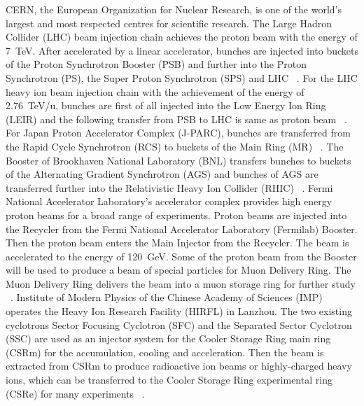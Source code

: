 \gls{CERN}, the European Organization for Nuclear Research, is one of the world's largest and most respected centres for scientific research. The Large Hadron Collider (\gls{LHC}) beam injection chain achieves the proton beam with the energy of \SI{7}{TeV}. After accelerated by a linear accelerator, bunches are injected into buckets of the Proton Synchrotron Booster (\gls{PSB}) and further into the Proton Synchrotron (\gls{PS}), the Super Proton Synchrotron (\gls{SPS}) and LHC ~\cite{ferrand_synchronization_2015}. For the LHC heavy ion beam injection chain with the achievement of the energy of \SI{2.76}{TeV/u}, bunches are first of all injected into the Low Energy Ion Ring (\gls{LEIR}) and the following transfer from PSB to LHC is same as proton beam ~\cite{ferrand_synchronization_2015}. For Japan Proton Accelerator Complex (\gls{J-PARC}), bunches are transferred from the Rapid Cycle Synchrotron (\gls{RCS}) to buckets of the Main Ring (\gls{MR}) ~\cite{_j-parc_????}. The Booster of Brookhaven National Laboratory (\gls{BNL}) transfers bunches to buckets of the Alternating Gradient Synchrotron (\gls{AGS}) and bunches of AGS are transferred further into the Relativistic Heavy Ion Collider (\gls{RHIC}) ~\cite{_brookhaven_????}. Fermi National Accelerator Laboratory's accelerator complex provides high energy proton beams for a broad range of experiments. Proton beams are injected into the Recycler from the Fermi National Accelerator Laboratory (\gls{Fermilab}) Booster. Then the proton beam enters the Main Injector from the Recycler. The beam is accelerated to the energy of \SI{120}{GeV}. Some of the proton beam from the Booster will be used to produce a beam of special particles for Muon Delivery Ring. The Muon Delivery Ring delivers the beam into a muon storage ring for further study ~\cite{_fermi_????}. Institute of Modern Physics of the Chinese Academy of Sciences (\gls{IMP}) operates the Heavy Ion Research Facility (\gls{HIRFL}) in Lanzhou. The two existing cyclotrons Sector Focusing Cyclotron (\gls{SFC}) and the Separated Sector Cyclotron (\gls{SSC}) are used as an injector system for the Cooler Storage Ring main ring (\gls{CSRm}) for the accumulation, cooling and acceleration. Then the beam is extracted from CSRm to produce radioactive ion beams or highly-charged heavy ions, which can be transferred to the Cooler Storage Ring experimental ring (\gls{CSRe}) for many experiments ~\cite{_institute_????, man_survey_2002}.  

